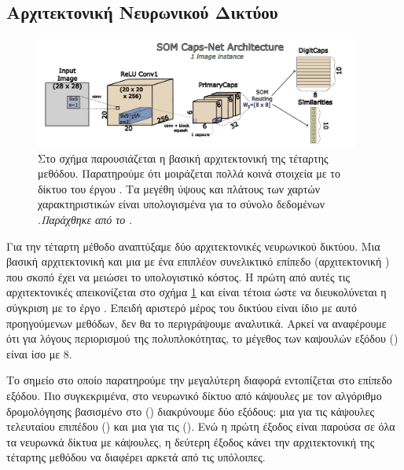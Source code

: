 \subsection{Αρχιτεκτονική Νευρωνικού Δικτύου}

\begin{figure}[h]
  \centering
  \includegraphics[width=0.95\textwidth]{images/chapter method/forth_method_architecture.pdf}
  \caption{Στο σχήμα παρουσιάζεται η βασική αρχιτεκτονική της τέταρτης μεθόδου. Παρατηρούμε ότι μοιράζεται πολλά κοινά στοιχεία με το δίκτυο του έργου \cite{sabour2017dynamic}. Τα μεγέθη ύψους και πλάτους των χαρτών χαρακτηριστικών είναι υπολογισμένα για το σύνολο δεδομένων .\textit{Παράχθηκε από το \href{https://inkscape.org/}{}}.}
  \label{fig:method_4_architecture}
\end{figure}

Για την τέταρτη μέθοδο αναπτύξαμε δύο αρχιτεκτονικές νευρωνικού δικτύου. Μια βασική αρχιτεκτονική και μια με ένα επιπλέον συνελικτικό επίπεδο (αρχιτεκτονική ) που σκοπό έχει να μειώσει το υπολογιστικό κόστος. Η πρώτη από αυτές τις αρχιτεκτονικές απεικονίζεται στο σχήμα \ref{fig:method_4_architecture} και είναι τέτοια ώστε να διευκολύνεται η σύγκριση με το έργο \cite{sabour2017dynamic}. Επειδή αριστερό μέρος του δικτύου είναι ίδιο με αυτό προηγούμενων μεθόδων, δεν θα το περιγράψουμε αναλυτικά. Αρκεί να αναφέρουμε ότι για λόγους περιορισμού της πολυπλοκότητας, το μέγεθος των καψουλών εξόδου () είναι ίσο με 8.

Το σημείο στο οποίο παρατηρούμε την μεγαλύτερη διαφορά εντοπίζεται στο επίπεδο εξόδου. Πιο συγκεκριμένα, στο νευρωνικό δίκτυο από κάψουλες με τον αλγόριθμο δρομολόγησης βασισμένο στο  () διακρύνουμε δύο εξόδους: μια για τις κάψουλες τελευταίου επιπέδου () και μια για τις  (). Ενώ η πρώτη έξοδος είναι παρούσα σε όλα τα νευρωνκά δίκτυα με κάψουλες, η δεύτερη έξοδος κάνει την αρχιτεκτονική της τέταρτης μεθόδου να διαφέρει αρκετά από τις υπόλοιπες.\par


